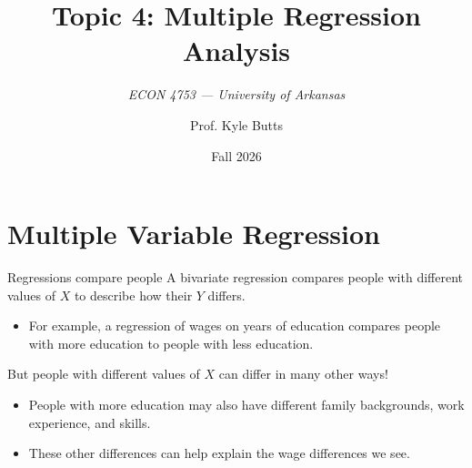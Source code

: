 \documentclass[aspectratio=169,t,11pt,table]{beamer}
\title{Topic 4: Multiple Regression Analysis}
\subtitle{\it  ECON 4753 — University of Arkansas}
\date{Fall 2026}
\author{Prof. Kyle Butts}
\begin{document}
\begin{frame}
\maketitle

\end{frame}

\section{Multiple Variable Regression}

\begin{frame}{Regressions compare people}
  A bivariate regression compares people with different values of $X$ to describe how their $Y$ differs.
  \begin{itemize}
    \item For example, a regression of wages on years of education compares people with more education to people with less education.
  \end{itemize}

  \pause
  \bigskip
  But people with different values of $X$ can differ in many other ways!
  \begin{itemize}
    \item People with more education may also have different family backgrounds, work experience, and skills.
    \item These other differences can help explain the wage differences we see.
  \end{itemize}
\end{frame}
\end{document}
